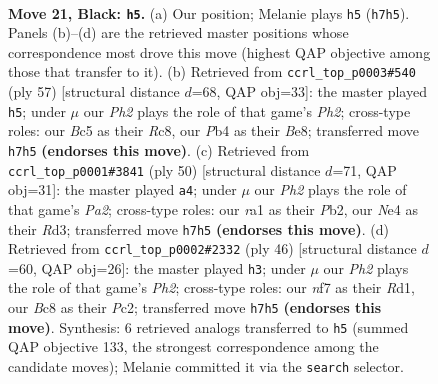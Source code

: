 \documentclass[11pt]{article}
\begin{document}
\clearpage

\begin{figure}[p]\centering
\begin{subfigure}{0.46\textwidth}\centering
\resizebox{\linewidth}{!}{%
\newchessgame
\chessboard[
  setfen={r1b5/2k2N1p/2p1p1p1/P1b5/1p2nP1P/4P3/8/RNB3K1 b - - 0 21},
  showmover=false,
  pgfstyle=straightmove, color=movearrow, markmove={h7-h5}
]}
\caption{}
\end{subfigure}\hfill
\begin{subfigure}{0.46\textwidth}\centering
\resizebox{\linewidth}{!}{%
\newchessgame
\chessboard[
  setfen={2r1b1k1/7p/p4pp1/2Nnp3/PP5P/5P2/3B2P1/2R3K1 b - - 0 29},
  showmover=false,
  pgfstyle=straightmove, color=movearrow, markmove={h7-h5}
]}
\caption{}
\end{subfigure}
\\[4pt]
\begin{subfigure}{0.46\textwidth}\centering
\resizebox{\linewidth}{!}{%
\newchessgame
\chessboard[
  setfen={4r1k1/1pp3b1/3pn1p1/p2N4/8/2PRB1PP/PP3K2/8 w - - 0 26},
  showmover=false,
  pgfstyle=straightmove, color=movearrow, markmove={a2-a4}
]}
\caption{}
\end{subfigure}\hfill
\begin{subfigure}{0.46\textwidth}\centering
\resizebox{\linewidth}{!}{%
\newchessgame
\chessboard[
  setfen={2k2b1r/pp4p1/2n3p1/3N2Pp/4p3/2B5/PPP4P/2KR4 w - - 0 24},
  showmover=false,
  pgfstyle=straightmove, color=movearrow, markmove={h2-h3}
]}
\caption{}
\end{subfigure}
\caption{\textbf{Move 21, Black: \texttt{h5}.} (a) Our position; Melanie plays \texttt{h5} (\texttt{h7h5}). Panels (b)--(d) are the retrieved master positions whose correspondence most drove this move (highest QAP objective among those that transfer to it). (b) Retrieved from \texttt{ccrl\_top\_p0003\#540} (ply 57) [structural distance $d$=68, QAP obj=33]: the master played \texttt{h5}; under $\mu$ our \emph{Ph2} plays the role of that game's \emph{Ph2}; cross-type roles: our \emph{B}c5 as their \emph{R}c8, our \emph{P}b4 as their \emph{B}e8; transferred move \texttt{h7h5} \textbf{(endorses this move)}. (c) Retrieved from \texttt{ccrl\_top\_p0001\#3841} (ply 50) [structural distance $d$=71, QAP obj=31]: the master played \texttt{a4}; under $\mu$ our \emph{Ph2} plays the role of that game's \emph{Pa2}; cross-type roles: our \emph{r}a1 as their \emph{P}b2, our \emph{N}e4 as their \emph{R}d3; transferred move \texttt{h7h5} \textbf{(endorses this move)}. (d) Retrieved from \texttt{ccrl\_top\_p0002\#2332} (ply 46) [structural distance $d$=60, QAP obj=26]: the master played \texttt{h3}; under $\mu$ our \emph{Ph2} plays the role of that game's \emph{Ph2}; cross-type roles: our \emph{n}f7 as their \emph{R}d1, our \emph{B}c8 as their \emph{P}c2; transferred move \texttt{h7h5} \textbf{(endorses this move)}. Synthesis: 6 retrieved analogs transferred to \texttt{h5} (summed QAP objective 133, the strongest correspondence among the candidate moves); Melanie committed it via the \texttt{search} selector.}
\label{fig:thought-m41}
\end{figure}
\end{document}
